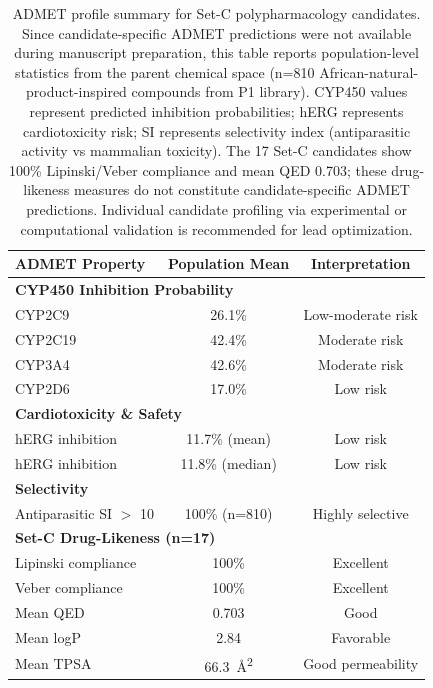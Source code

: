 \begin{table}[h!]
\centering
\caption{ADMET profile summary for Set-C polypharmacology candidates. Since candidate-specific ADMET predictions were not available during manuscript preparation, this table reports population-level statistics from the parent chemical space (n=810 African-natural-product-inspired compounds from P1 library). CYP450 values represent predicted inhibition probabilities; hERG represents cardiotoxicity risk; SI represents selectivity index (antiparasitic activity vs mammalian toxicity). The 17 Set-C candidates show 100\% Lipinski/Veber compliance and mean QED 0.703; these drug-likeness measures do not constitute candidate-specific ADMET predictions. Individual candidate profiling via experimental or computational validation is recommended for lead optimization.}
\label{tab:admet}
\small
\begin{tabular}{lcc}
\toprule
ADMET Property & Population Mean & Interpretation \\
\midrule
\multicolumn{3}{l}{\textbf{CYP450 Inhibition Probability}} \\
CYP2C9 & 26.1\% & Low-moderate risk \\
CYP2C19 & 42.4\% & Moderate risk \\
CYP3A4 & 42.6\% & Moderate risk \\
CYP2D6 & 17.0\% & Low risk \\
\midrule
\multicolumn{3}{l}{\textbf{Cardiotoxicity \& Safety}} \\
hERG inhibition & 11.7\% (mean) & Low risk \\
hERG inhibition & 11.8\% (median) & Low risk \\
\midrule
\multicolumn{3}{l}{\textbf{Selectivity}} \\
Antiparasitic SI $>$ 10 & 100\% (n=810) & Highly selective \\
\midrule
\multicolumn{3}{l}{\textbf{Set-C Drug-Likeness (n=17)}} \\
Lipinski compliance & 100\% & Excellent \\
Veber compliance & 100\% & Excellent \\
Mean QED & 0.703 & Good \\
Mean logP & 2.84 & Favorable \\
Mean TPSA & \SI{66.3}{\angstrom\squared} & Good permeability \\
\bottomrule
\end{tabular}
\end{table}